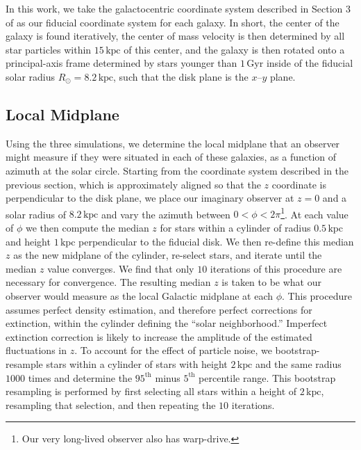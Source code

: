 \documentclass[twocolumn]{aastex62}
\newcommand{\kpc}{\text{kpc}}
\newcommand{\Gyr}{\text{Gyr}}
\begin{document}
In this work, we take the galactocentric coordinate system described in
Section 3 of \citet{2018arXiv180610564S} as our fiducial coordinate system for
each galaxy. In short, the center of the galaxy is found iteratively, the
center of mass velocity is then determined by all star particles within
$15\,\kpc$ of this center, and the galaxy is then rotated onto a
principal-axis frame determined by stars younger than $1\,\Gyr$ inside of the
fiducial solar radius $R_{\odot} = 8.2\,\kpc$, such that the disk plane is the
$x$--$y$ plane.

\subsection{Local Midplane} \label{ssec:local_midplane}
Using the three simulations, we determine the local midplane that an observer
might measure if they were situated in each of these galaxies, as a function
of azimuth at the solar circle. Starting from the coordinate system described
in the previous section, which is approximately aligned so that the $z$
coordinate is perpendicular to the disk plane, we place our imaginary observer
at $z=0$ and a solar radius of $8.2\,\kpc$ and vary the azimuth between
$0<\phi<2\pi$\footnote{Our very long-lived observer also has warp-drive.}. At
each value of $\phi$ we then compute the median $z$ for stars within a
cylinder of radius $0.5\,\kpc$ and height $1\,\kpc$ perpendicular to the
fiducial disk. We then re-define this median $z$ as the new midplane of the
cylinder, re-select stars, and iterate until the median $z$ value converges.
We find that only $10$ iterations of this procedure are necessary for
convergence. The resulting median $z$ is taken to be what our observer would
measure as the local Galactic midplane at each $\phi$. This procedure assumes
perfect density estimation, and therefore perfect corrections for extinction,
within the cylinder defining the ``solar neighborhood.'' Imperfect extinction
correction is likely to increase the amplitude of the estimated fluctuations
in $z$. To account for the effect of particle noise, we bootstrap-resample
stars within a cylinder of stars with height $2\,\kpc$ and the same radius
$1000$ times and determine the $95^{\text{th}}$ minus $5^{\text{th}}$
percentile range. This bootstrap resampling is performed by first selecting
all stars within a height of $2\,\kpc$, resampling that selection, and then
repeating the $10$ iterations.
\end{document}
